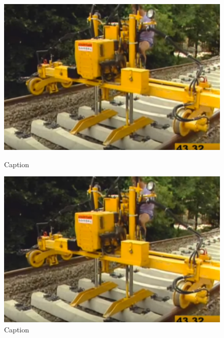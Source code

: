 \begin{figure}[h!]
  \centering
  \label{app-1} 
  \begin{minipage}[b]{0.3\linewidth}
    \centering
    \includegraphics[width=\linewidth]{application-img/app 1.png} 
    \caption{Caption} 
    \label{fig:app1}
    \vspace{4ex}
  \end{minipage} %
  \begin{minipage}[b]{0.3\linewidth}
    \centering
    \includegraphics[width=\linewidth]{application-img/app 2.png} 
    \caption{Caption} 
    \label{fig:app2}
    \vspace{4ex}
  \end{minipage} %
  \begin{minipage}[b]{0.3\linewidth}
    \centering

\end{minipage}
\end{figure}
